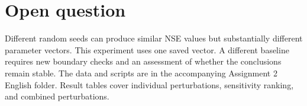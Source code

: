 \documentclass[11pt,a4paper]{article}
\begin{document}
\section{Open question}
Different random seeds can produce similar NSE values but substantially different parameter vectors. This experiment uses one saved vector. A different baseline requires new boundary checks and an assessment of whether the conclusions remain stable.
The data and scripts are in the accompanying Assignment 2 English folder. Result tables cover individual perturbations, sensitivity ranking, and combined perturbations.
\end{document}
